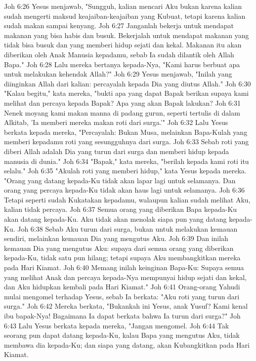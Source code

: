 Joh 6:26  Yesus menjawab, "Sungguh, kalian mencari Aku bukan karena kalian sudah mengerti maksud keajaiban-keajaiban yang Kubuat, tetapi karena kalian sudah makan sampai kenyang.
Joh 6:27  Janganlah bekerja untuk mendapat makanan yang bisa habis dan busuk. Bekerjalah untuk mendapat makanan yang tidak bisa busuk dan yang memberi hidup sejati dan kekal. Makanan itu akan diberikan oleh Anak Manusia kepadamu, sebab Ia sudah dilantik oleh Allah Bapa."
Joh 6:28  Lalu mereka bertanya kepada-Nya, "Kami harus berbuat apa untuk melakukan kehendak Allah?"
Joh 6:29  Yesus menjawab, "Inilah yang diinginkan Allah dari kalian: percayalah kepada Dia yang diutus Allah."
Joh 6:30  "Kalau begitu," kata mereka, "bukti apa yang dapat Bapak berikan supaya kami melihat dan percaya kepada Bapak? Apa yang akan Bapak lakukan?
Joh 6:31  Nenek moyang kami makan manna di padang gurun, seperti tertulis di dalam Alkitab, 'Ia memberi mereka makan roti dari surga.'"
Joh 6:32  Lalu Yesus berkata kepada mereka, "Percayalah: Bukan Musa, melainkan Bapa-Kulah yang memberi kepadamu roti yang sesungguhnya dari surga.
Joh 6:33  Sebab roti yang diberi Allah adalah Dia yang turun dari surga dan memberi hidup kepada manusia di dunia."
Joh 6:34  "Bapak," kata mereka, "berilah kepada kami roti itu selalu."
Joh 6:35  "Akulah roti yang memberi hidup," kata Yesus kepada mereka. "Orang yang datang kepada-Ku tidak akan lapar lagi untuk selamanya. Dan orang yang percaya kepada-Ku tidak akan haus lagi untuk selamanya.
Joh 6:36  Tetapi seperti sudah Kukatakan kepadamu, walaupun kalian sudah melihat Aku, kalian tidak percaya.
Joh 6:37  Semua orang yang diberikan Bapa kepada-Ku akan datang kepada-Ku. Aku tidak akan menolak siapa pun yang datang kepada-Ku.
Joh 6:38  Sebab Aku turun dari surga, bukan untuk melakukan kemauan sendiri, melainkan kemauan Dia yang mengutus Aku.
Joh 6:39  Dan inilah kemauan Dia yang mengutus Aku: supaya dari semua orang yang diberikan kepada-Ku, tidak satu pun hilang; tetapi supaya Aku membangkitkan mereka pada Hari Kiamat.
Joh 6:40  Memang inilah keinginan Bapa-Ku: Supaya semua yang melihat Anak dan percaya kepada-Nya mempunyai hidup sejati dan kekal, dan Aku hidupkan kembali pada Hari Kiamat."
Joh 6:41  Orang-orang Yahudi mulai mengomel terhadap Yesus, sebab Ia berkata: "Aku roti yang turun dari surga."
Joh 6:42  Mereka berkata, "Bukankah ini Yesus, anak Yusuf? Kami kenal ibu bapak-Nya! Bagaimana Ia dapat berkata bahwa Ia turun dari surga?"
Joh 6:43  Lalu Yesus berkata kepada mereka, "Jangan mengomel.
Joh 6:44  Tak seorang pun dapat datang kepada-Ku, kalau Bapa yang mengutus Aku, tidak membawa dia kepada-Ku; dan siapa yang datang, akan Kubangkitkan pada Hari Kiamat.
